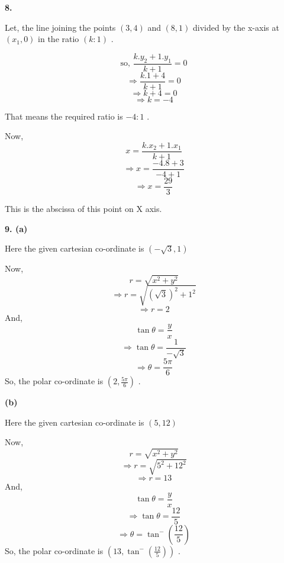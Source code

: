\documentclass{article}
\begin{document}
\begin{flushleft}
\textbf{8.}\par
\vspace{0.5cm}
Let, the line joining the points $(3, 4)$ and $(8, 1)$ divided by the x-axis at $(x_1,0)$ in the ratio $(k:1)$ .\par
\[\text{so, } \frac{k.y_2 + 1 . y_1}{k+1} = 0\]
\[\Longrightarrow \frac{k.1 + 4}{k+1} = 0\]
\[\Longrightarrow k+4 = 0\]
\[\Longrightarrow k = -4\]\par
That means the required ratio is $-4 : 1$ .\par
\vspace{0.4cm}
Now, \[x=\frac{k.x_2 + 1.x_1}{k+1}\]
\[\Longrightarrow x=\frac{-4.8 + 3}{-4+1}\]
\[\Longrightarrow x = \frac{29}{3}\]\par
\vspace{0.4cm}
This is the abscissa of this point on X axis.\par
\newpage

\textbf{9. \hspace{0.4cm}(a)}\par
\vspace{0.5cm}
Here the given cartesian co-ordinate is $(-\sqrt{3},1)$\par
Now,\[r=\sqrt{x^{2}+y^{2}}\]
\[\Longrightarrow r = \sqrt{({\sqrt{3}})^{2} + 1^{2}}\]
\[\Longrightarrow r = 2\]
And,
\[\tan \theta = \frac{y}{x}\]
\[\Longrightarrow \tan \theta = \frac{1}{-\sqrt{3}}\]
\[\Longrightarrow \theta = \frac{5\pi}{6}\]
So, the polar co-ordinate is $(2,\frac{5\pi}{6})$ .\par
\vspace{1cm}
\textbf{\hspace{1cm}(b)}\par
\vspace{0.5cm}
Here the given cartesian co-ordinate is $(5,12)$\par
Now,\[r=\sqrt{x^{2}+y^{2}}\]
\[\Longrightarrow r = \sqrt{5^{2} + 12^{2}}\]
\[\Longrightarrow r = 13\]
And,
\[\tan \theta = \frac{y}{x}\]
\[\Longrightarrow \tan \theta = \frac{12}{5}\]
\[\Longrightarrow \theta = \tan^{-}(\frac{12}{5})\]
So, the polar co-ordinate is $(13,\tan^{-}(\frac{12}{5}))$ .\par
\vspace{1cm}


\end{flushleft}
\end{document}

